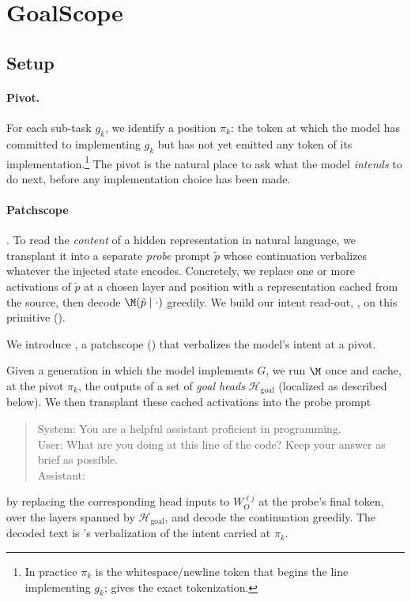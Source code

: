 \section{GoalScope}
\label{app:goalscope}

\subsection{Setup}

\paragraph{Pivot.} For each sub-task $g_k$, we identify a \pivot position $\pi_k$: the token at which the model has committed to implementing $g_k$ but has not yet emitted any token of its implementation.\footnote{In practice $\pi_k$ is the whitespace/newline token that begins the line implementing $g_k$;  gives the exact tokenization.} The pivot is the natural place to ask what the model \emph{intends} to do next, before any implementation choice has been made.

\paragraph{Patchscope} \citep{ghandeharioun2024patchscope}. To read the \emph{content} of a hidden representation in natural language, we transplant it into a separate \emph{probe} prompt $\tilde{p}$ whose continuation verbalizes whatever the injected state encodes. Concretely, we replace one or more activations of $\tilde{p}$ at a chosen layer and position with a representation cached from the source, then decode $\M(\tilde{p} \mid \cdot)$ greedily. We build our intent read-out, \goalscope, on this primitive ().

We introduce \goalscope, a patchscope () that verbalizes the model's intent at a pivot.

Given a generation in which the model implements $G$, we run $\M$ once and cache, at the pivot $\pi_k$, the outputs of a set of \emph{goal heads} $\mathcal{H}_{\text{goal}}$ (localized as described below). We then transplant these cached activations into the probe prompt
%
\begin{quote}
\small\ttfamily
System: You are a helpful assistant proficient in programming.\\
User: What are you doing at this line of the code? Keep your answer as brief as possible.\\
Assistant:
\end{quote}
%
by replacing the corresponding head inputs to $W_O^{\ell j}$ at the probe's final token, over the layers spanned by $\mathcal{H}_{\text{goal}}$, and decode the continuation greedily. The decoded text is \goalscope's verbalization of the intent carried at $\pi_k$. 

